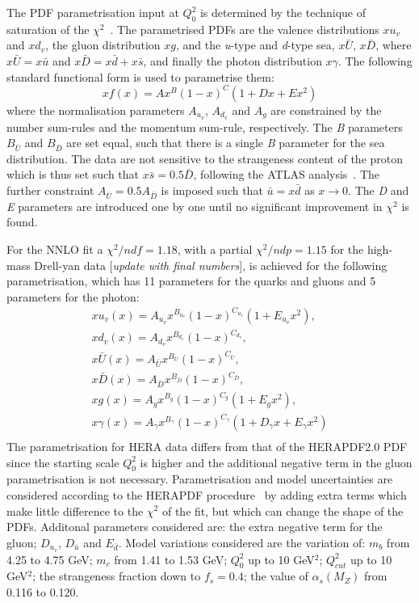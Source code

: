 The PDF parametrisation input at $Q^2_0$ is determined by the technique of saturation of the $\chi^{2}$~\cite{h1chisqsat}.
%
The parametrised PDFs are the valence distributions $xu_{v}$ and $xd_{v}$, the gluon distribution $xg$, and the \textit{u}-type and \textit{d}-type sea, $x\bar{U}$, $x\bar{D}$, where $x\bar{U} = x\bar{u}$ and $x\bar{D} = x\bar{d} + x\bar{s}$, and finally the photon distribution $x\gamma$. The following standard functional form is used to parametrise them:
\begin{equation}
xf(x) = Ax^{B}(1-x)^{C}(1+Dx+Ex^{2})
\end{equation}
where the normalisation parameters $A_{u_{v}}$, $A_{d_{v}}$ and $A_{g}$ are constrained by the number sum-rules and the 
momentum sum-rule, respectively. The \textit{B} parameters $B_{\bar{U}}$ and $B_{\bar{D}}$ are set equal, such that there 
is a single \textit{B} parameter for the sea distribution. The data are not sensitive to the 
strangeness content of the proton which is thus set such that $x\bar{s} = 0.5\bar{D}$, following the ATLAS 
analysis~\cite{Aad:2012sb}. The further constraint $A_{\bar{U}} = 0.5 A_{\bar{D}}$ is imposed such that $\bar{u}=x\bar{d}$ as $x \to 0$.
The \textit{D} and \textit{E} parameters are introduced one by one until no significant 
improvement in $\chi^{2}$ is found. 

 For the NNLO fit a $\chi^{2}/ndf = 1.18$, with a partial $\chi^2/ndp = 1.15$ for the high-mass Drell-yan data [{\it update with final numbers}], is achieved for the following parametrisation, which has 11 parameters for the quarks and gluons and 5 parameters for the photon:
\begin{eqnarray}
xu_v(x) = A_{u_v}x^{B_{u_v}}(1-x)^{C_{u_v}}(1+E_{u_v}x^{2}), \\
xd_v(x) = A_{d_v}x^{B_{d_v}}(1-x)^{C_{d_v}}, \\
x\bar{U}(x) = A_{\bar{U}}x^{B_{\bar{U}}}(1-x)^{C_{\bar{U}}}, \\
x\bar{D}(x) = A_{\bar{D}}x^{B_{\bar{D}}}(1-x)^{C_{\bar{D}}}, \\
xg(x) = A_{g}x^{B_{g}}(1-x)^{C_{g}}(1+E_{g}x^{2}), \\
x\gamma(x) = A_{\gamma}x^{B_{\gamma}}(1-x)^{C_{\gamma}}(1+D_{\gamma}x+E_{\gamma}x^{2}) \\
\end{eqnarray}
The parametrisation for HERA data differs from that of the HERAPDF2.0 PDF since the starting scale $Q^2_0$ is higher and the additional negative term in the gluon parametrisation is not necessary.
Parametrisation and model uncertainties are considered according to the HERAPDF 
procedure~\cite{hera} 
by adding extra terms which make little difference to the $\chi^2$ of the fit, but which can change the shape of the PDFs. Additonal parameters considered are: the extra negative term for the gluon; $D_{u_v}$, $D_{\bar{u}}$ and $E_{\bar{d}}$. Model variations considered are the variation of: 
$m_b$ from 4.25 to 4.75 GeV; $m_c$ from 1.41 to 1.53 GeV;  $Q_0^2$ up to 10 GeV$^2$; 
$Q_{cut}^2$ up to 10 GeV$^2$; the strangeness fraction down to $f_s=0.4$; the value of $\alpha_s(M_Z)$ from 0.116 to 0.120.
